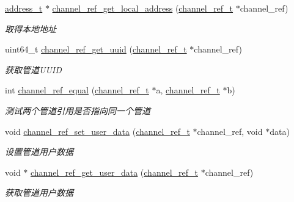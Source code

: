 \begin{DoxyCompactItemize}
\hyperlink{a00051_a7a6e75b85c8b441f843bd40004a7d9d5_a7a6e75b85c8b441f843bd40004a7d9d5}{address\+\_\+t} $\ast$ \hyperlink{a00102_ga1dcf6af0c992fa21f9dcd03c8f763ec4_ga1dcf6af0c992fa21f9dcd03c8f763ec4}{channel\+\_\+ref\+\_\+get\+\_\+local\+\_\+address} (\hyperlink{a00051_a151271c9d188ef28d4d24bb81dcc1263_a151271c9d188ef28d4d24bb81dcc1263}{channel\+\_\+ref\+\_\+t} $\ast$channel\+\_\+ref)
\begin{DoxyCompactList}\small\item\em 取得本地地址 \end{DoxyCompactList}\item 
uint64\+\_\+t \hyperlink{a00102_ga3fd39b821fef38abd518db6240e79068_ga3fd39b821fef38abd518db6240e79068}{channel\+\_\+ref\+\_\+get\+\_\+uuid} (\hyperlink{a00051_a151271c9d188ef28d4d24bb81dcc1263_a151271c9d188ef28d4d24bb81dcc1263}{channel\+\_\+ref\+\_\+t} $\ast$channel\+\_\+ref)
\begin{DoxyCompactList}\small\item\em 获取管道\+U\+U\+I\+D \end{DoxyCompactList}\item 
int \hyperlink{a00102_gad44fcb68845cb3ebb582a9de6db9abd0_gad44fcb68845cb3ebb582a9de6db9abd0}{channel\+\_\+ref\+\_\+equal} (\hyperlink{a00051_a151271c9d188ef28d4d24bb81dcc1263_a151271c9d188ef28d4d24bb81dcc1263}{channel\+\_\+ref\+\_\+t} $\ast$a, \hyperlink{a00051_a151271c9d188ef28d4d24bb81dcc1263_a151271c9d188ef28d4d24bb81dcc1263}{channel\+\_\+ref\+\_\+t} $\ast$b)
\begin{DoxyCompactList}\small\item\em 测试两个管道引用是否指向同一个管道 \end{DoxyCompactList}\item 
void \hyperlink{a00102_ga92427ed1f084e9b019acfcdf79bb4b44_ga92427ed1f084e9b019acfcdf79bb4b44}{channel\+\_\+ref\+\_\+set\+\_\+user\+\_\+data} (\hyperlink{a00051_a151271c9d188ef28d4d24bb81dcc1263_a151271c9d188ef28d4d24bb81dcc1263}{channel\+\_\+ref\+\_\+t} $\ast$channel\+\_\+ref, void $\ast$data)
\begin{DoxyCompactList}\small\item\em 设置管道用户数据 \end{DoxyCompactList}\item 
void $\ast$ \hyperlink{a00102_gaf4021842b995f59d23b931dd9ad3ff07_gaf4021842b995f59d23b931dd9ad3ff07}{channel\+\_\+ref\+\_\+get\+\_\+user\+\_\+data} (\hyperlink{a00051_a151271c9d188ef28d4d24bb81dcc1263_a151271c9d188ef28d4d24bb81dcc1263}{channel\+\_\+ref\+\_\+t} $\ast$channel\+\_\+ref)
\begin{DoxyCompactList}\small\item\em 获取管道用户数据 \end{DoxyCompactList}\end{DoxyCompactItemize}



